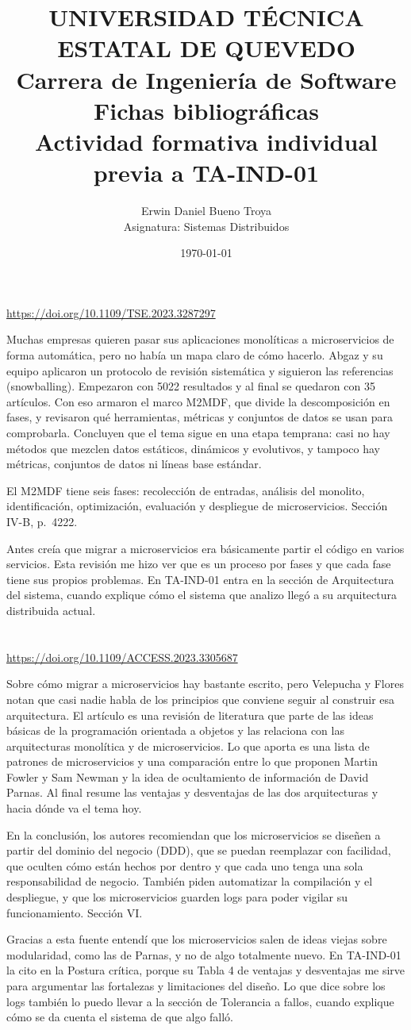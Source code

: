 \documentclass[11pt,a4paper]{article}
\title{{\large\textbf{UNIVERSIDAD TÉCNICA ESTATAL DE QUEVEDO}}\\[2pt]
  {\normalsize Carrera de Ingeniería de Software}\\[16pt]
  Fichas bibliográficas\\[4pt]
  \large Actividad formativa individual previa a TA-IND-01}
\author{Erwin Daniel Bueno Troya\\
  Asignatura: Sistemas Distribuidos}
\date{\today}
\newcommand{\ficha}[6]{%
  \section{\texorpdfstring{\citefield{#2}{title}}{#1}}
  \begin{description}[style=nextline,leftmargin=0pt,itemsep=6pt]
    \item[Referencia (IEEE)] \cite{#2}
    \item[DOI verificado] \href{https://doi.org/#3}{https://doi.org/#3}
    \item[Resumen] #4
    \item[Dato concreto] #5
    \item[Nota personal] #6
  \end{description}
}
\begin{document}
\maketitle

\ficha{Abgaz et al. (2023)}{abgaz2023}{10.1109/TSE.2023.3287297}
{Muchas empresas quieren pasar sus aplicaciones monolíticas a microservicios de forma automática, pero no había un mapa claro de cómo hacerlo. Abgaz y su equipo aplicaron un protocolo de revisión sistemática y siguieron las referencias (snowballing). Empezaron con 5022 resultados y al final se quedaron con 35 artículos. Con eso armaron el marco M2MDF, que divide la descomposición en fases, y revisaron qué herramientas, métricas y conjuntos de datos se usan para comprobarla. Concluyen que el tema sigue en una etapa temprana: casi no hay métodos que mezclen datos estáticos, dinámicos y evolutivos, y tampoco hay métricas, conjuntos de datos ni líneas base estándar.}
{El M2MDF tiene seis fases: recolección de entradas, análisis del monolito, identificación, optimización, evaluación y despliegue de microservicios. Sección IV-B, p.~4222.}
{Antes creía que migrar a microservicios era básicamente partir el código en varios servicios. Esta revisión me hizo ver que es un proceso por fases y que cada fase tiene sus propios problemas. En TA-IND-01 entra en la sección de Arquitectura del sistema, cuando explique cómo el sistema que analizo llegó a su arquitectura distribuida actual.}

\ficha{Velepucha y Flores (2023)}{velepucha2023}{10.1109/ACCESS.2023.3305687}
{Sobre cómo migrar a microservicios hay bastante escrito, pero Velepucha y Flores notan que casi nadie habla de los principios que conviene seguir al construir esa arquitectura. El artículo es una revisión de literatura que parte de las ideas básicas de la programación orientada a objetos y las relaciona con las arquitecturas monolítica y de microservicios. Lo que aporta es una lista de patrones de microservicios y una comparación entre lo que proponen Martin Fowler y Sam Newman y la idea de ocultamiento de información de David Parnas. Al final resume las ventajas y desventajas de las dos arquitecturas y hacia dónde va el tema hoy.}
{En la conclusión, los autores recomiendan que los microservicios se diseñen a partir del dominio del negocio (DDD), que se puedan reemplazar con facilidad, que oculten cómo están hechos por dentro y que cada uno tenga una sola responsabilidad de negocio. También piden automatizar la compilación y el despliegue, y que los microservicios guarden logs para poder vigilar su funcionamiento. Sección VI.}
{Gracias a esta fuente entendí que los microservicios salen de ideas viejas sobre modularidad, como las de Parnas, y no de algo totalmente nuevo. En TA-IND-01 la cito en la Postura crítica, porque su Tabla 4 de ventajas y desventajas me sirve para argumentar las fortalezas y limitaciones del diseño. Lo que dice sobre los logs también lo puedo llevar a la sección de Tolerancia a fallos, cuando explique cómo se da cuenta el sistema de que algo falló.}
\end{document}
